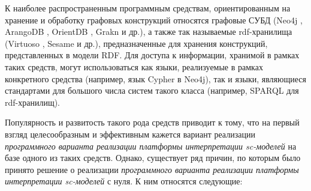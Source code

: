 \begin{SCn}
{	К наиболее распространенным программным средствам, ориентированным на хранение и обработку графовых конструкций относятся графовые СУБД (Neo4j , ArangoDB , OrientDB , Grakn  и др.), а также так называемые rdf-хранилища (Virtuoso , Sesame  и др.), предназначенные для хранения конструкций, представленных в модели RDF. Для доступа к информации, хранимой в рамках таких средств, могут использоваться как языки, реализуемые в рамках конкретного средства (например, язык Cypher в Neo4j), так и языки, являющиеся стандартами для большого числа систем такого класса (например, SPARQL для rdf-хранилищ).
	
	Популярность и развитость такого рода средств приводит к тому, что на первый взгляд целесообразным и эффективным кажется вариант реализации \textit{программного варианта реализации платформы интерпретации sc-моделей} на базе одного из таких средств. Однако, существует ряд причин, по которым было принято решение о реализации \textit{программного варианта реализации платформы интерпретации sc-моделей} с нуля. К ним относятся следующие:
	
}
\end{SCn}
